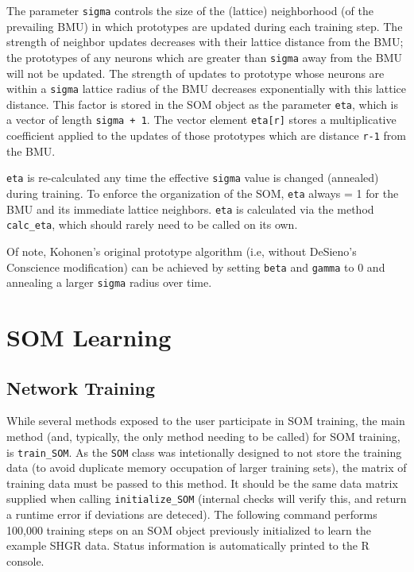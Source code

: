\documentclass[]{article}
\newenvironment{Shaded}{\begin{snugshade}}{\end{snugshade}}
\newcommand{\CommentTok}[1]{\textcolor[rgb]{0.56,0.35,0.01}{\textit{#1}}}
\newcommand{\NormalTok}[1]{#1}
\newcommand{\OperatorTok}[1]{\textcolor[rgb]{0.81,0.36,0.00}{\textbf{#1}}}
\begin{document}
The parameter \texttt{sigma} controls the size of the (lattice) neighborhood (of the prevailing BMU) in which prototypes are updated during each training step. The strength of neighbor updates decreases with their lattice distance from the BMU; the prototypes of any neurons which are greater than \texttt{sigma} away from the BMU will not be updated. The strength of updates to prototype whose neurons are within a \texttt{sigma} lattice radius of the BMU decreases exponentially with this lattice distance. This factor is stored in the SOM object as the parameter \texttt{eta}, which is a vector of length \texttt{sigma\ +\ 1}. The vector element \texttt{eta{[}r{]}} stores a multiplicative coefficient applied to the updates of those prototypes which are distance \texttt{r-1} from the BMU.

\begin{Shaded}
\end{Shaded}

\texttt{eta} is re-calculated any time the effective \texttt{sigma} value is changed (annealed) during training. To enforce the organization of the SOM, \texttt{eta} always = 1 for the BMU and its immediate lattice neighbors. \texttt{eta} is calculated via the method \texttt{calc\_eta}, which should rarely need to be called on its own.

Of note, Kohonen's original prototype algorithm (i.e, without DeSieno's Conscience modification) can be achieved by setting \texttt{beta} and \texttt{gamma} to 0 and annealing a larger \texttt{sigma} radius over time.

\hypertarget{som-learning}{%
\section{SOM Learning}\label{som-learning}}

\hypertarget{network-training}{%
\subsection{Network Training}\label{network-training}}

While several methods exposed to the user participate in SOM training, the main method (and, typically, the only method needing to be called) for SOM training, is \texttt{train\_SOM}. As the \texttt{SOM} class was intetionally designed to not store the training data (to avoid duplicate memory occupation of larger training sets), the matrix of training data must be passed to this method. It should be the same data matrix supplied when calling \texttt{initialize\_SOM} (internal checks will verify this, and return a runtime error if deviations are deteced). The following command performs 100,000 training steps on an SOM object previously initialized to learn the example SHGR data. Status information is automatically printed to the R console.
\end{document}
